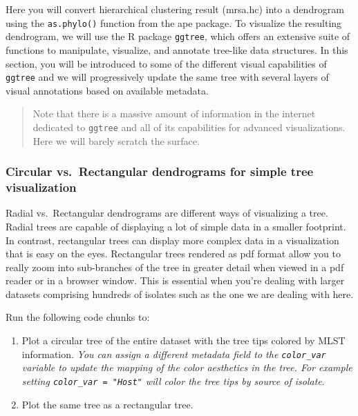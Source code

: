 \documentclass[
]{book}
\providecommand{\tightlist}{%
  \setlength{\itemsep}{0pt}\setlength{\parskip}{0pt}}
\begin{document}
Here you will convert hierarchical clustering result (mrsa.hc) into a dendrogram using the \texttt{as.phylo()} function from the ape package. To visualize the resulting dendrogram, we will use the R package \texttt{ggtree}, which offers an extensive suite of functions to manipulate, visualize, and annotate tree-like data structures. In this section, you will be introduced to some of the different visual capabilities of \texttt{ggtree} and we will progressively update the same tree with several layers of visual annotations based on available metadata.

\begin{quote}
Note that there is a massive amount of information in the internet dedicated to \texttt{ggtree} and all of its capabilities for advanced visualizations. Here we will barely scratch the surface.
\end{quote}

\subsubsection{Circular vs.~Rectangular dendrograms for simple tree visualization}\label{circular-vs.-rectangular-dendrograms-for-simple-tree-visualization}

Radial vs.~Rectangular dendrograms are different ways of visualizing a tree. Radial trees are capable of displaying a lot of simple data in a smaller footprint. In contrast, rectangular trees can display more complex data in a visualization that is easy on the eyes. Rectangular trees rendered as pdf format allow you to really zoom into sub-branches of the tree in greater detail when viewed in a pdf reader or in a browser window. This is essential when you're dealing with larger datasets comprising hundreds of isolates such as the one we are dealing with here.

Run the following code chunks to:

\begin{enumerate}
\def\labelenumi{\arabic{enumi}.}
\tightlist
\item
  Plot a circular tree of the entire dataset with the tree tips colored by MLST information. \emph{You can assign a different metadata field to the \texttt{color\_var} variable to update the mapping of the color aesthetics in the tree. For example setting \texttt{color\_var\ =\ "Host"} will color the tree tips by source of isolate}.
\item
  Plot the same tree as a rectangular tree.
\end{enumerate}
\end{document}
